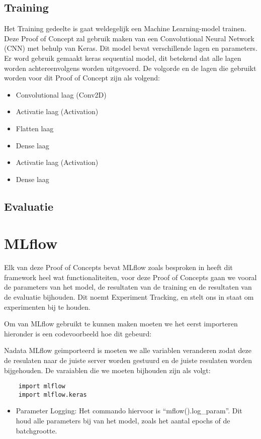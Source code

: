 \subsection{Training}
Het Training gedeelte is gaat weldegelijk een Machine Learning-model trainen. Deze Proof of Concept zal gebruik maken van een Convolutional Neural Network (CNN) met behulp van Keras. Dit model bevat verschillende lagen en parameters.
Er word gebruik gemaakt keras sequential model, dit betekend dat alle lagen worden achtereenvolgens worden uitgevoerd. De volgorde en de lagen die gebruikt worden voor dit Proof of Concept zijn als volgend:
\begin{itemize}
    \item Convolutional laag (Conv2D)
    \item Activatie laag (Activation)
    \item Flatten laag
    \item Dense laag
    \item Activatie laag (Activation)
    \item Dense laag
\end{itemize}
\subsection{Evaluatie}

\section*{MLflow}
Elk van deze Proof of Concepts bevat MLflow zoals besproken in heeft dit framework heel wat functionaliteiten, voor deze Proof of Concepts gaan we vooral de parameters van het model, de resultaten van de training en de resultaten van de evaluatie bijhouden.
Dit noemt Experiment Tracking, en stelt ons in staat om experimenten bij te houden.

Om van MLflow gebruikt te kunnen maken moeten we het eerst importeren hieronder is een codevoorbeeld hoe dit gebeurd:

Nadata MLflow geimporteerd is moeten we alle variablen veranderen zodat deze de resulaten naar de juiste server worden gestuurd en de juiste resulaten worden bijgehouden.
De varaiablen die we moeten bijhouden zijn als volgt:
\begin{verbatim}
    import mlflow
    import mlflow.keras
\end{verbatim}

\begin{itemize}
    \item Parameter Logging: Het commando hiervoor is ``mflow().log_param''. Dit houd alle parameters bij van het model, zoals het aantal epochs of de batchgrootte.
\end{itemize}
